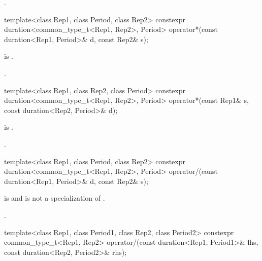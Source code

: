 \begin{itemdescr}
\pnum
\returns
{}.
\end{itemdescr}

%
\begin{itemdecl}
template<class Rep1, class Period, class Rep2>
  constexpr duration<common_type_t<Rep1, Rep2>, Period>
    operator*(const duration<Rep1, Period>& d, const Rep2& s);
\end{itemdecl}

\begin{itemdescr}
\pnum
\constraints
{} is .

\pnum
\returns
{}.
\end{itemdescr}

%
\begin{itemdecl}
template<class Rep1, class Rep2, class Period>
  constexpr duration<common_type_t<Rep1, Rep2>, Period>
    operator*(const Rep1& s, const duration<Rep2, Period>& d);
\end{itemdecl}

\begin{itemdescr}
\pnum
\constraints
{} is .

\pnum
\returns
{}.
\end{itemdescr}

%
\begin{itemdecl}
template<class Rep1, class Period, class Rep2>
  constexpr duration<common_type_t<Rep1, Rep2>, Period>
    operator/(const duration<Rep1, Period>& d, const Rep2& s);
\end{itemdecl}

\begin{itemdescr}
\pnum
\constraints
{} is 
and  is not a specialization of .

\pnum
\returns
{}.
\end{itemdescr}

%
\begin{itemdecl}
template<class Rep1, class Period1, class Rep2, class Period2>
  constexpr common_type_t<Rep1, Rep2>
    operator/(const duration<Rep1, Period1>& lhs, const duration<Rep2, Period2>& rhs);
\end{itemdecl}

